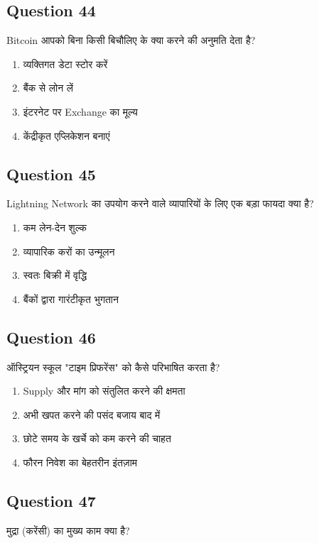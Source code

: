 \documentclass[12pt,a4paper]{article}
\begin{document}
\bigskip


\subsection*{Question 44}
Bitcoin आपको बिना किसी बिचौलिए के क्या करने की अनुमति देता है?

\begin{enumerate}[label=\Alph*., leftmargin=*]
\item व्यक्तिगत डेटा स्टोर करें
\item बैंक से लोन लें
\item इंटरनेट पर Exchange का मूल्य
\item केंद्रीकृत एप्लिकेशन बनाएं
\end{enumerate}

\bigskip


\subsection*{Question 45}
Lightning Network का उपयोग करने वाले व्यापारियों के लिए एक बड़ा फायदा क्या है?

\begin{enumerate}[label=\Alph*., leftmargin=*]
\item कम लेन-देन शुल्क
\item व्यापारिक करों का उन्मूलन
\item स्वतः बिक्री में वृद्धि
\item बैंकों द्वारा गारंटीकृत भुगतान
\end{enumerate}

\bigskip


\subsection*{Question 46}
ऑस्ट्रियन स्कूल "टाइम प्रिफरेंस" को कैसे परिभाषित करता है?

\begin{enumerate}[label=\Alph*., leftmargin=*]
\item Supply और मांग को संतुलित करने की क्षमता
\item अभी खपत करने की पसंद बजाय बाद में
\item छोटे समय के खर्चे को कम करने की चाहत
\item फौरन निवेश का बेहतरीन इंतज़ाम
\end{enumerate}

\bigskip


\subsection*{Question 47}
मुद्रा (करेंसी) का मुख्य काम क्या है?
\end{document}
